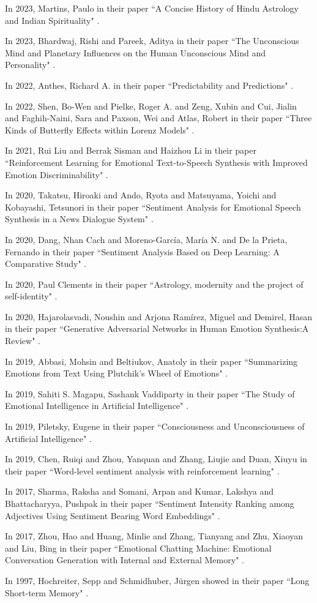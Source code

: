 In 2023, Martins, Paulo in their paper ``A Concise History of Hindu Astrology and Indian Spirituality" \cite{article2}.

In 2023, Bhardwaj, Rishi and Pareek, Aditya in their paper ``The Unconscious Mind and Planetary Influences on the Human Unconscious Mind and Personality" \cite{article1}.

In 2022, Anthes, Richard A. in their paper ``Predictability and Predictions" \cite{atmos13081292}.

In 2022, Shen, Bo-Wen and Pielke, Roger A. and Zeng, Xubin and Cui, Jialin and Faghih-Naini, Sara and Paxson, Wei and Atlas, Robert in their paper ``Three Kinds of Butterfly Effects within Lorenz Models" \cite{encyclopedia2030084}.

In 2021, Rui Liu and Berrak Sisman and Haizhou Li in their paper ``Reinforcement Learning for Emotional Text-to-Speech Synthesis with Improved Emotion Discriminability" \cite{liu21p_interspeech}.

In 2020, Takatsu, Hiroaki  and Ando, Ryota and Matsuyama, Yoichi  and Kobayashi, Tetsunori in their paper ``Sentiment Analysis for Emotional Speech Synthesis in a News Dialogue System" \cite{takatsu-etal-2020-sentiment}.

In 2020, Dang, Nhan Cach and Moreno-García, María N. and De la Prieta, Fernando in their paper ``Sentiment Analysis Based on Deep Learning: A Comparative Study" \cite{electronics9030483}.

In 2020, Paul Clements in their paper ``Astrology, modernity and the project of self-identity" \cite{doi:10.1080/14755610.2022.2093234}.

In 2020, Hajarolasvadi, Noushin and Arjona Ramírez, Miguel and Demirel, Hasan in their paper ``Generative Adversarial Networks in Human Emotion Synthesis:A Review" \cite{unknown}.

In 2019, Abbasi, Mohsin and Beltiukov, Anatoly in their paper ``Summarizing Emotions from Text Using Plutchik's Wheel of Emotions" \cite{article3}.

In 2019, Sahiti S. Magapu, Sashank Vaddiparty in their paper ``The Study of Emotional Intelligence in
Artificial Intelligence" \cite{ISSN-2456-2165}.

In 2019, Piletsky, Eugene in their paper ``Consciousness and Unconsciousness of Artificial Intelligence" \cite{article4}.

In 2019, Chen, Ruiqi and Zhou, Yanquan and Zhang, Liujie and Duan, Xiuyu in their paper ``Word-level sentiment analysis with reinforcement learning" \cite{article5}.

In 2017, Sharma, Raksha and Somani, Arpan and Kumar, Lakshya and Bhattacharyya, Pushpak in their paper ``Sentiment Intensity Ranking among Adjectives Using Sentiment Bearing Word Embeddings" \cite{inproceedings}.

In 2017, Zhou, Hao and Huang, Minlie and Zhang, Tianyang and Zhu, Xiaoyan and Liu, Bing in their paper ``Emotional Chatting Machine: Emotional Conversation Generation with Internal and External Memory" \cite{article5}.

In 1997, Hochreiter, Sepp and Schmidhuber, Jürgen showed in their paper ``Long Short-term Memory" \cite{article}.